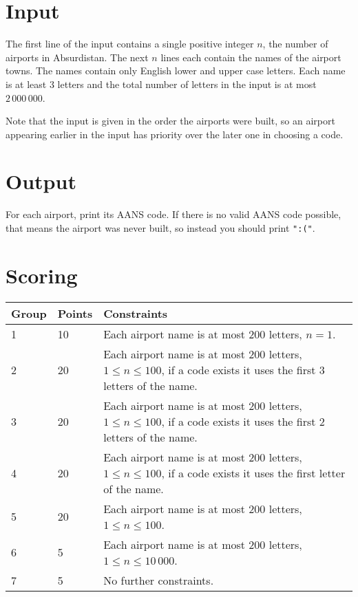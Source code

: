 \section*{Input}
The first line of the input contains a single positive integer $n$, the number of airports in Absurdistan.
The next $n$ lines each contain the names of the airport towns. 
The names contain only English lower and upper case letters.
Each name is at least $3$ letters and the total number of letters in the input is at most $2 \, 000 \, 000$.

Note that the input is given in the order the airports were built,
so an airport appearing earlier in the input has priority over the later one in choosing a code.

\section*{Output}
For each airport, print its AANS code.
If there is no valid AANS code possible, that means the airport was never built, so instead you should print \texttt{":("}.

\section*{Scoring}
\begin{tabular}{|l|l|l|}
\hline
Group & Points & Constraints \\ \hline
1     & 10   & Each airport name is at most $200$ letters, $n = 1$. \\ \hline
2     & 20   & Each airport name is at most $200$ letters, $1 \leq n \leq 100$, if a code exists it uses the first 3 letters of the name. \\ \hline
3     & 20   & Each airport name is at most $200$ letters, $1 \leq n \leq 100$, if a code exists it uses the first 2 letters of the name. \\ \hline
4     & 20   & Each airport name is at most $200$ letters, $1 \leq n \leq 100$, if a code exists it uses the first letter of the name. \\ \hline
5     & 20   & Each airport name is at most $200$ letters, $1 \leq n \leq 100$. \\ \hline
6     & 5    & Each airport name is at most $200$ letters, $1 \leq n \leq 10 \, 000$. \\ \hline
7     & 5    & No further constraints. \\ \hline
\end{tabular}
